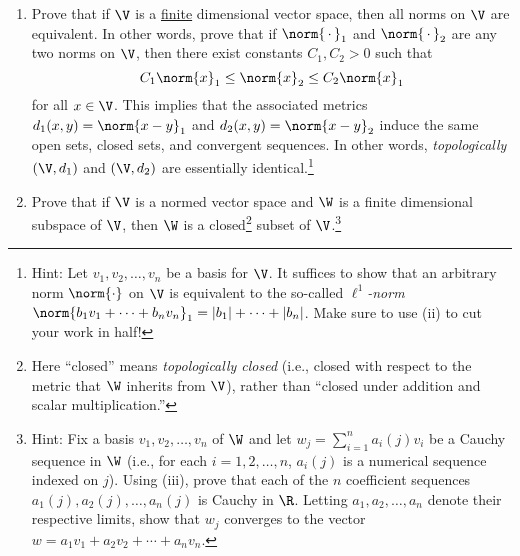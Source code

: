 \documentclass{homework}
\begin{document}
\begin{Exercise}
\begin{enumerate}
  \item Prove that if $\V$ is a \underline{finite} dimensional
    vector space, then all norms on $\V$ are equivalent.  In other
    words, prove that if $\norm{\,\cdot\,}_1$ and
    $\norm{\,\cdot\,}_2$ are any two norms on $\V$, then there exist
    constants $C_1,C_2>0$ such that
    \begin{equation*}
      C_1 \norm{x}_1 \leq \norm{x}_2 \leq C_2 \norm{x}_1
    \end{equation*}
    for all $x \in \V$.  This implies that the associated metrics
    $d_1(x,y) = \norm{x-y}_1$ and $d_2(x,y) = \norm{x-y}_2$ induce
    the same open sets, closed sets, and convergent sequences.  In
    other words, \emph{topologically} $(\V,d_1)$ and $(\V,d_2)$ are
    essentially identical.\footnote{Hint: Let $v_1,v_2,\ldots, v_n$
      be a basis for $\V$.  It suffices to show that an arbitrary
      norm $\norm{\cdot}$ on $\V$ is equivalent to the so-called
      \emph{$\ell^1$-norm}
      $\norm{ b_1 v_1 + \cdots + b_n v_n}_1 = |b_1| + \cdots +
      |b_n|$.  Make sure to use (ii) to cut your work in half!}

    \begin{solution}
    \end{solution}

  \item Prove that if $\V$ is a normed vector space and $\W$ is a
    finite dimensional subspace of $\V$, then $\W$ is a
    closed\footnote{Here ``closed'' means \emph{topologically
        closed} (i.e., closed with respect to the metric that $\W$
      inherits from $\V$), rather than ``closed under addition and
      scalar multiplication.''}  subset of $\V$.\footnote{Hint: Fix
      a basis $v_1,v_2,\ldots,v_n$ of $\W$ and let
      $w_j = \sum_{i=1}^n a_i(j) v_i$ be a Cauchy sequence in $\W$
      (i.e., for each $i = 1,2,\ldots, n$, $a_i(j)$ is a numerical
      sequence indexed on $j$).  Using (iii), prove that each of the
      $n$ coefficient sequences $a_1(j), a_2(j), \ldots, a_n(j)$ is
      Cauchy in $\R$.  Letting $a_1,a_2,\ldots,a_n$ denote their
      respective limits, show that $w_j$ converges to the vector
      $w= a_1 v_1 + a_2 v_2 + \cdots + a_n v_n$.}

    \begin{solution}
    \end{solution}

	\end{enumerate}
\end{Exercise}
\end{document}
